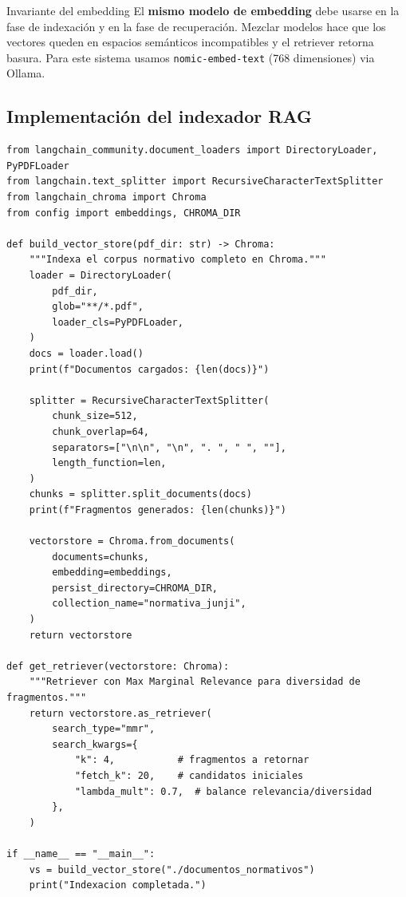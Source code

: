 \documentclass[12pt,a4paper]{article}
\begin{document}
\begin{conceptbox}{Invariante del embedding}
El \textbf{mismo modelo de embedding} debe usarse en la fase de indexación
y en la fase de recuperación. Mezclar modelos hace que los vectores queden
en espacios semánticos incompatibles y el retriever retorna basura.
Para este sistema usamos \texttt{nomic-embed-text} (768 dimensiones) via Ollama.
\end{conceptbox}

\subsection{Implementación del indexador RAG}

\begin{lstlisting}[style=pythonstyle, caption={rag\_indexer.py --- Indexación del corpus normativo}]
from langchain_community.document_loaders import DirectoryLoader, PyPDFLoader
from langchain.text_splitter import RecursiveCharacterTextSplitter
from langchain_chroma import Chroma
from config import embeddings, CHROMA_DIR

def build_vector_store(pdf_dir: str) -> Chroma:
    """Indexa el corpus normativo completo en Chroma."""
    loader = DirectoryLoader(
        pdf_dir,
        glob="**/*.pdf",
        loader_cls=PyPDFLoader,
    )
    docs = loader.load()
    print(f"Documentos cargados: {len(docs)}")

    splitter = RecursiveCharacterTextSplitter(
        chunk_size=512,
        chunk_overlap=64,
        separators=["\n\n", "\n", ". ", " ", ""],
        length_function=len,
    )
    chunks = splitter.split_documents(docs)
    print(f"Fragmentos generados: {len(chunks)}")

    vectorstore = Chroma.from_documents(
        documents=chunks,
        embedding=embeddings,
        persist_directory=CHROMA_DIR,
        collection_name="normativa_junji",
    )
    return vectorstore

def get_retriever(vectorstore: Chroma):
    """Retriever con Max Marginal Relevance para diversidad de fragmentos."""
    return vectorstore.as_retriever(
        search_type="mmr",
        search_kwargs={
            "k": 4,           # fragmentos a retornar
            "fetch_k": 20,    # candidatos iniciales
            "lambda_mult": 0.7,  # balance relevancia/diversidad
        },
    )

if __name__ == "__main__":
    vs = build_vector_store("./documentos_normativos")
    print("Indexacion completada.")
\end{lstlisting}
\end{document}
